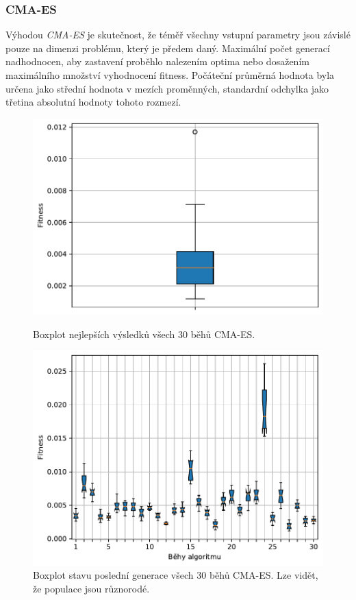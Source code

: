 \subsubsection{CMA-ES}
Výhodou \emph{CMA-ES} je skutečnost, že téměř všechny vstupní parametry jsou závislé pouze na dimenzi problému, který je předem daný. Maximální počet generací nadhodnocen, aby zastavení proběhlo nalezením optima nebo dosažením maximálního množství vyhodnocení fitness. Počáteční průměrná hodnota byla určena jako střední hodnota v mezích proměnných, standardní odchylka jako třetina absolutní hodnoty tohoto rozmezí.

\begin{figure}[H]
\begin{minipage}[t]{0.475\linewidth}
\includegraphics[width=\linewidth]{obrazky-figures/statistics/Benchmarks/Ackley/CMAES/bestsBoxplot_WithOutliers.pdf}
\caption{Boxplot nejlepších výsledků všech $30$ běhů CMA-ES.}
\label{fg:bench:ackley:cmaes:best}
\end{minipage}
\hfill
\begin{minipage}[t]{0.475\linewidth}
\includegraphics[width=\linewidth]{obrazky-figures/statistics/Benchmarks/Ackley/CMAES/lastGenBoxplots.pdf}
\caption{Boxplot stavu poslední generace všech $30$ běhů CMA-ES. Lze vidět, že populace jsou různorodé.}
\label{fg:bench:ackley:cmaes:lastGen}
\end{minipage}
\end{figure}
